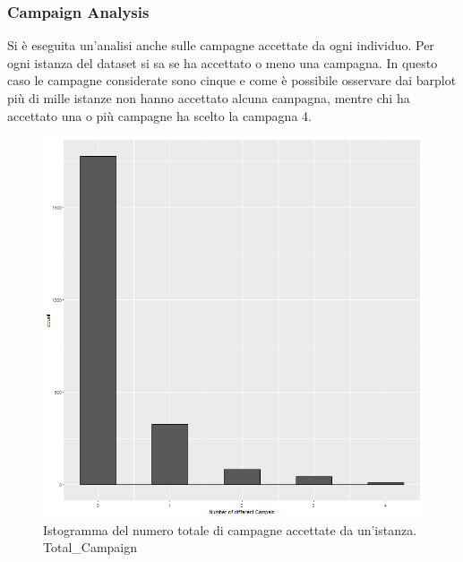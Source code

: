 \documentclass[letterpaper,11pt]{article}
\begin{document}
\newpage
\subsubsection{Campaign Analysis}

Si è eseguita un'analisi anche sulle campagne accettate da ogni individuo. 
Per ogni istanza del dataset si sa se ha accettato o meno una campagna. In questo caso le campagne considerate sono cinque e come è possibile osservare dai barplot più di mille istanze non hanno accettato alcuna campagna, mentre chi ha accettato una o più campagne ha scelto la campagna 4.\\

\begin{figure}[H]
  \centering
  \begin{minipage}[b]{0.4\textwidth}
    \includegraphics[width=\textwidth]{Img/EDA/EDA042.png}
    \caption{Istogramma del numero totale di campagne accettate da un'istanza. Total\_Campaign}
    \label{fig:IstogrammaTotalCampaign1}
  \end{minipage}
  \hfill
  \begin{minipage}[b]{0.4\textwidth}

\end{minipage}
\end{figure}
\end{document}

